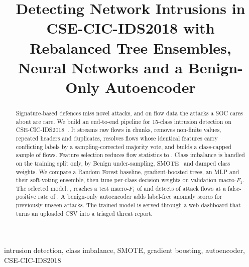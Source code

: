 \documentclass[conference]{IEEEtran}
\begin{document}
\title{Detecting Network Intrusions in CSE-CIC-IDS2018 with Rebalanced Tree Ensembles, Neural Networks and a Benign-Only Autoencoder}

\author{
\and
{}
}

\maketitle

\begin{abstract}
Signature-based defences miss novel attacks, and on flow data the attacks a
SOC cares about are rare. We build an end-to-end pipeline for 15-class
intrusion detection on CSE-CIC-IDS2018~\cite{sharafaldin2018}. It streams
\NumRawFlows{} raw flows in chunks, removes non-finite values, repeated headers
and duplicates, resolves flows whose identical features carry conflicting labels
by a sampling-corrected majority vote, and builds a class-capped sample of
\NumSampleFlows{} flows. Feature selection reduces \NumFeaturesIn{} flow
statistics to \NumFeaturesOut{}. Class imbalance is handled on the training
split only, by Benign under-sampling, SMOTE~\cite{chawla2002} and damped class
weights. We compare a Random Forest baseline, gradient-boosted trees, an MLP
and their soft-voting ensemble, then tune per-class decision weights on
validation macro-$F_1$. The selected model, \BestModel{}, reaches a test
macro-$F_1$ of \BestMacroFOne{} and detects \DetectionRate{} of attack flows at a
false-positive rate of \FalsePositiveRate{}. A benign-only autoencoder adds
label-free anomaly scores for previously unseen attacks. The trained model is
served through a web dashboard that turns an uploaded CSV into a triaged
threat report.
\end{abstract}

\begin{IEEEkeywords}
intrusion detection, class imbalance, SMOTE, gradient boosting, autoencoder, CSE-CIC-IDS2018
\end{IEEEkeywords}

\end{document}
